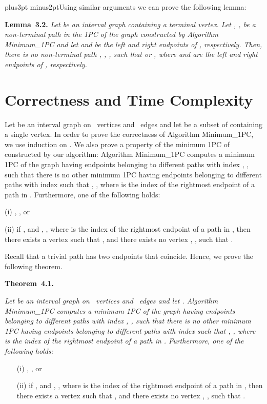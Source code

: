 \documentclass[10pt]{article}
\def\yskip{\penalty-50\vskip3pt plus3pt minus2pt}
\def\y{\yskip}
\begin{document}
{\y Using similar arguments we can prove the following lemma:

\medskip
\par\noindent
{\bf Lemma~3.2.} {\it Let  be an interval graph containing a
terminal vertex. Let , ,
be a non-terminal path in the 1PC 
of the graph  constructed by Algorithm Minimum\_1PC and let
 and  be the left and right endpoints of ,
respectively. Then, there is no non-terminal path , , , such that  or
, where  and  are the left and right
endpoints of , respectively.}


\section{Correctness and Time Complexity}

Let  be an interval graph on ~vertices and~ edges and let
 be a subset of  containing a single vertex. In
order to prove the correctness of Algorithm Minimum\_1PC, we use
induction on . We also prove a property of the minimum 1PC
 of  constructed by our algorithm:
Algorithm Minimum\_1PC computes a minimum 1PC
 of the graph  having
 endpoints  belonging to different
paths with index , , such that
there is no other minimum 1PC 
having  endpoints  belonging to
different paths with index  such that
, ,
where  is the index of the rightmost endpoint of a path
in . Furthermore, one of the
following holds:

\noindent (i) ,
, or

\noindent (ii) if ,
 and , , where 
is the index of the rightmost endpoint of a path in
, then there exists a vertex 
such that ,  and there exists no vertex , , such that
.

\noindent Recall that a trivial path has two endpoints that
coincide. Hence, we prove the following theorem.

\bigskip
\par\noindent
{\bf Theorem~4.1.} {\it Let  be an interval graph on
~vertices and~ edges and let . Algorithm
Minimum\_1PC computes a minimum 1PC 
of the graph  having  endpoints 
belonging to different paths with index , , such that there is no other minimum 1PC
 having 
endpoints  belonging to different paths with index
 such that
, ,
where  is the index of the rightmost endpoint of a path
in . Furthermore, one of the
following holds:
\begin{itemize}
\item[(i)] ,
, or \item[(ii)] if ,  and
, , where  is the index of the rightmost endpoint
of a path in , then there exists a
vertex  such that ,  and there exists no
vertex , , such that
.
\end{itemize}}

}
\end{document}
